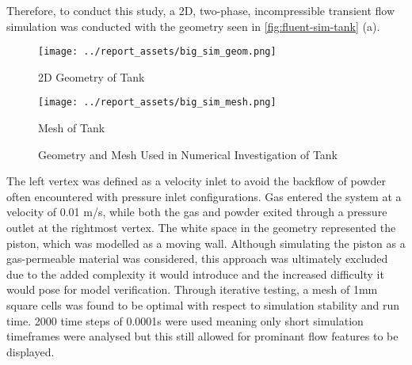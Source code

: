 Therefore, to conduct this study, a 2D, two-phase, incompressible transient flow simulation was conducted with the geometry seen in \autoref{fig:fluent-sim-tank} (a).
\begin{figure}[htbp]
    \centering

    \begin{minipage}{0.45\textwidth}
        \centering
        \texttt{[image: ../report\_assets/big\_sim\_geom.png]}
        \caption*{2D Geometry of Tank}
    \end{minipage}
    \hfill
    \begin{minipage}{0.45\textwidth}
        \centering
        \texttt{[image: ../report\_assets/big\_sim\_mesh.png]}
        \caption*{Mesh of Tank}\label{fig:mesh-tank}
    \end{minipage}
    \caption{Geometry and Mesh Used in Numerical Investigation of Tank}\label{fig:fluent-sim-tank}
\end{figure}
The left vertex was defined as a velocity inlet to avoid the backflow of powder often encountered with pressure inlet configurations. Gas entered the system at a velocity of 0.01 m/s, while both the gas and powder exited through a pressure outlet at the rightmost vertex. The white space in the geometry represented the piston, which was modelled as a moving wall. Although simulating the piston as a gas-permeable material was considered, this approach was ultimately excluded due to the added complexity it would introduce and the increased difficulty it would pose for model verification. Through iterative testing, a mesh of 1mm square cells was found to be optimal with respect to simulation stability and run time. 2000 time steps of 0.0001s were used meaning only short simulation timeframes were analysed but this still allowed for prominant flow features to be displayed.

